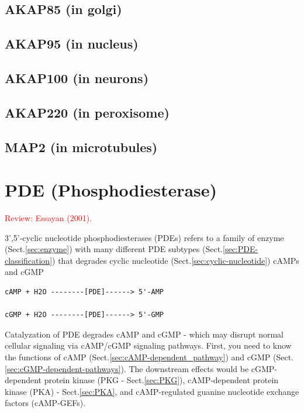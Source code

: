 \subsection{AKAP85 (in golgi)}
\label{sec:AKAP85}

\subsection{AKAP95 (in nucleus)}
\label{sec:AKAP95}

\subsection{AKAP100 (in neurons)}
\label{sec:AKAP100}

\subsection{AKAP220 (in peroxisome)}
\label{sec:AKAP220}

\subsection{MAP2 (in microtubules)}
\label{sec:MAP2}


\section{PDE (Phosphodiesterase)}
\label{sec:PDE}
\label{sec:phosphodiesterase}

\textcolor{red}{Review: Essayan (2001).}


3',5'-cyclic nucleotide phosphodiesterases (PDEs) refers to a family of enzyme
(Sect.\ref{sec:enzyme}) with many different PDE subtypes
(Sect.\ref{sec:PDE-classification}) that degrades cyclic nucleotide
(Sect.\ref{sec:cyclic-nucleotide}) cAMPs and cGMP
\begin{verbatim}
cAMP + H2O --------[PDE]------> 5'-AMP

cGMP + H2O --------[PDE]------> 5'-GMP 
\end{verbatim}

Catalyzation of PDE degrades cAMP and cGMP - which may disrupt normal cellular
signaling via cAMP/cGMP signaling pathways. First, you need to know the
functions of cAMP (Sect.\ref{sec:cAMP-dependent_pathway}) and cGMP
(Sect.\ref{sec:cGMP-dependent-pathways}). The downstream effects would be
cGMP-dependent protein kinase (PKG - Sect.\ref{sec:PKG}), cAMP-dependent protein
kinase (PKA) - Sect.\ref{sec:PKA}, and cAMP-regulated guanine nucleotide
exchange factors (cAMP-GEFs). 

